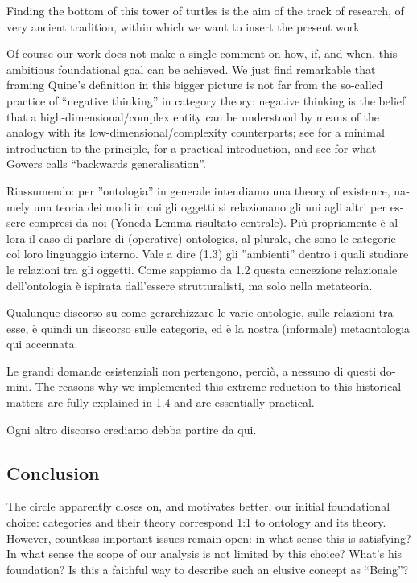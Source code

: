 Finding the bottom of this tower of turtles is the aim of the track of research, of very ancient tradition, within which we want to insert the present work.

Of course our work does not make a single comment on how, if, and when, this ambitious foundational goal can be achieved. We just find remarkable that framing Quine's definition in this bigger picture is not far from the so-called practice of ``negative thinking'' in category theory: negative thinking is the belief that a high-dimensional/complex entity can be understood by means of the analogy with its low-dimensional/complexity counterparts; see \cite{nlab:category-order,nlab:neg-think} for a minimal introduction to the principle, \cite{baez2010lectures} for a practical introduction, and see \cite{gowers2007} for what Gowers calls ``backwards generalisation''.


\begin{italian}
	Riassumendo: per ''ontologia'' in generale intendiamo una theory of existence, namely una teoria dei modi in cui gli oggetti si relazionano gli uni agli altri per essere compresi da noi (Yoneda Lemma risultato centrale).
	Più propriamente è allora il caso di parlare di (operative) ontologies, al plurale, che sono le categorie col loro linguaggio interno. Vale a dire (1.3) gli ''ambienti'' dentro i quali studiare le relazioni tra gli oggetti. Come sappiamo da 1.2 questa concezione relazionale dell'ontologia è ispirata dall'essere strutturalisti, ma solo nella metateoria. %

	Qualunque discorso su come gerarchizzare le varie ontologie, sulle relazioni tra esse, è quindi un discorso sulle categorie, ed è la nostra (informale) metaontologia qui accennata.

	Le grandi domande esistenziali non pertengono, perciò, a nessuno di questi domini. The reasons why we implemented this extreme reduction to this historical matters are fully explained in 1.4 and are essentially practical.

	Ogni altro discorso crediamo debba partire da qui.
\end{italian}
\subsection{Conclusion}
The circle apparently closes on, and motivates better, our initial foundational choice: categories and their theory correspond 1:1 to ontology and its theory. However, countless important issues remain open: in what sense this is satisfying? In what sense the scope of our analysis is not limited by this choice? What's his foundation? Is this a faithful way to describe such an elusive concept as ``Being''?

